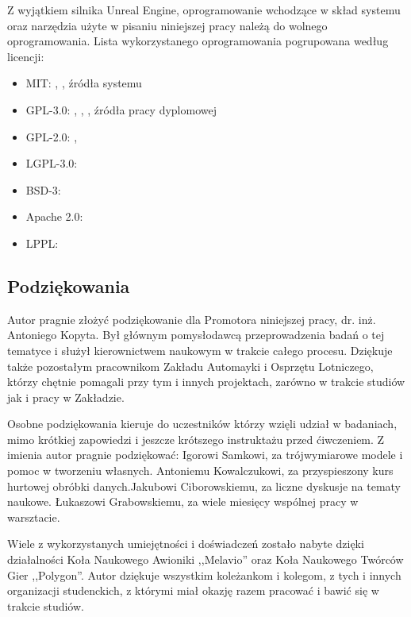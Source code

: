 Z wyjątkiem silnika Unreal Engine\cite{soft:ue4}, oprogramowanie wchodzące w skład systemu oraz narzędzia użyte w pisaniu niniejszej pracy należą do wolnego oprogramowania. Lista wykorzystanego oprogramowania pogrupowana według licencji:
\begin{itemize}
    \item MIT: \cite{soft:vuepress}, \cite{soft:vscode}, źródła systemu
    \item GPL-3.0: \cite{soft:sitl}, \cite{soft:blender}, \cite{soft:wutthesis}, źródła pracy dyplomowej
    \item GPL-2.0: \cite{soft:git}, \cite{soft:tortoisesvn}
    \item LGPL-3.0: \cite{soft:mavlink}
    \item BSD-3: \cite{soft:pandas}
    \item Apache 2.0: \cite{soft:svn}
    \item LPPL: \cite{soft:latex}
\end{itemize}

\subsection{Podziękowania}
Autor pragnie złożyć podziękowanie dla Promotora niniejszej pracy, dr. inż. Antoniego Kopyta. Był głównym pomysłodawcą przeprowadzenia badań o tej tematyce i służył kierownictwem naukowym w trakcie całego procesu. Dziękuje także pozostałym pracownikom Zakładu Automayki i Osprzętu Lotniczego, którzy chętnie pomagali przy tym i innych projektach, zarówno w trakcie studiów jak i pracy w Zakładzie.

Osobne podziękowania kieruje do uczestników którzy wzięli udział w badaniach, mimo krótkiej zapowiedzi i jeszcze krótszego instruktażu przed ćiwczeniem. Z imienia autor pragnie podziękować: Igorowi Samkowi, za trójwymiarowe modele i pomoc w tworzeniu własnych. Antoniemu Kowalczukowi, za przyspieszony kurs hurtowej obróbki danych.Jakubowi Ciborowskiemu, za liczne dyskusje na tematy naukowe. Łukaszowi Grabowskiemu, za wiele miesięcy wspólnej pracy w warsztacie.

Wiele z wykorzystanych umiejętności i doświadczeń zostało nabyte dzięki działalności Koła Naukowego Awioniki ,,Melavio'' oraz Koła Naukowego Twórców Gier ,,Polygon''. Autor dziękuje wszystkim koleżankom i kolegom, z tych i innych organizacji studenckich, z którymi miał okazję razem pracować i bawić się w trakcie studiów.
